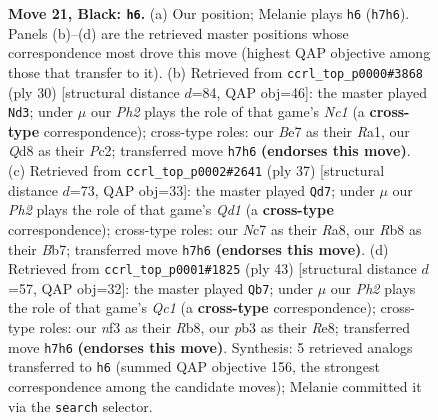 \documentclass[11pt]{article}
\begin{document}
\begin{figure}[p]
\caption{\textbf{Move 21, Black: \texttt{h6}.} (a) Our position; Melanie plays \texttt{h6} (\texttt{h7h6}). Panels (b)--(d) are the retrieved master positions whose correspondence most drove this move (highest QAP objective among those that transfer to it). (b) Retrieved from \texttt{ccrl\_top\_p0000\#3868} (ply 30) [structural distance $d$=84, QAP obj=46]: the master played \texttt{Nd3}; under $\mu$ our \emph{Ph2} plays the role of that game's \emph{Nc1} (a \textbf{cross-type} correspondence); cross-type roles: our \emph{B}e7 as their \emph{R}a1, our \emph{Q}d8 as their \emph{P}c2; transferred move \texttt{h7h6} \textbf{(endorses this move)}. (c) Retrieved from \texttt{ccrl\_top\_p0002\#2641} (ply 37) [structural distance $d$=73, QAP obj=33]: the master played \texttt{Qd7}; under $\mu$ our \emph{Ph2} plays the role of that game's \emph{Qd1} (a \textbf{cross-type} correspondence); cross-type roles: our \emph{N}c7 as their \emph{R}a8, our \emph{R}b8 as their \emph{B}b7; transferred move \texttt{h7h6} \textbf{(endorses this move)}. (d) Retrieved from \texttt{ccrl\_top\_p0001\#1825} (ply 43) [structural distance $d$=57, QAP obj=32]: the master played \texttt{Qb7}; under $\mu$ our \emph{Ph2} plays the role of that game's \emph{Qc1} (a \textbf{cross-type} correspondence); cross-type roles: our \emph{n}f3 as their \emph{R}b8, our \emph{p}b3 as their \emph{R}e8; transferred move \texttt{h7h6} \textbf{(endorses this move)}. Synthesis: 5 retrieved analogs transferred to \texttt{h6} (summed QAP objective 156, the strongest correspondence among the candidate moves); Melanie committed it via the \texttt{search} selector.}
\label{fig:thought-m41}
\end{figure}

\clearpage
\end{document}
